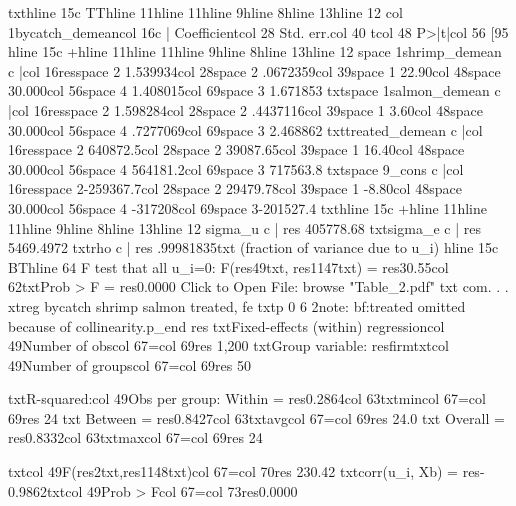 {txt}{hline 15}{c TT}{hline 11}{hline 11}{hline 9}{hline 8}{hline 13}{hline 12}
{col 1}bycatch_demean{col 16}{c |} Coefficient{col 28}  Std. err.{col 40}      t{col 48}   P>|t|{col 56}     [95%
{hline 15}{c +}{hline 11}{hline 11}{hline 9}{hline 8}{hline 13}{hline 12}
{space 1}shrimp_demean {c |}{col 16}{res}{space 2} 1.539934{col 28}{space 2} .0672359{col 39}{space 1}   22.90{col 48}{space 3}0.000{col 56}{space 4} 1.408015{col 69}{space 3} 1.671853
{txt}{space 1}salmon_demean {c |}{col 16}{res}{space 2} 1.598284{col 28}{space 2} .4437116{col 39}{space 1}    3.60{col 48}{space 3}0.000{col 56}{space 4} .7277069{col 69}{space 3} 2.468862
{txt}treated_demean {c |}{col 16}{res}{space 2} 640872.5{col 28}{space 2} 39087.65{col 39}{space 1}   16.40{col 48}{space 3}0.000{col 56}{space 4} 564181.2{col 69}{space 3} 717563.8
{txt}{space 9}_cons {c |}{col 16}{res}{space 2}-259367.7{col 28}{space 2} 29479.78{col 39}{space 1}   -8.80{col 48}{space 3}0.000{col 56}{space 4}  -317208{col 69}{space 3}-201527.4
{txt}{hline 15}{c +}{hline 11}{hline 11}{hline 9}{hline 8}{hline 13}{hline 12}
       sigma_u {c |} {res} 405778.68
       {txt}sigma_e {c |} {res} 5469.4972
           {txt}rho {c |} {res} .99981835{txt}   (fraction of variance due to u_i)
{hline 15}{c BT}{hline 64}
F test that all u_i=0: F({res}49{txt}, {res}1147{txt}) = {res}30.55{col 62}{txt}Prob > F = {res}0.0000
Click to Open File:  {browse "Table_2.pdf"}
{txt}
{com}. 
. 
. xtreg bycatch shrimp salmon treated, fe
{txt}{p 0 6 2}note: {bf:treated} omitted because of collinearity.{p_end}
{res}
{txt}Fixed-effects (within) regression{col 49}Number of obs{col 67}={col 69}{res}     1,200
{txt}Group variable: {res}firm{txt}{col 49}Number of groups{col 67}={col 69}{res}        50

{txt}R-squared:{col 49}Obs per group:
     Within  = {res}0.2864{col 63}{txt}min{col 67}={col 69}{res}        24
{txt}     Between = {res}0.8427{col 63}{txt}avg{col 67}={col 69}{res}      24.0
{txt}     Overall = {res}0.8332{col 63}{txt}max{col 67}={col 69}{res}        24

{txt}{col 49}F({res}2{txt},{res}1148{txt}){col 67}={col 70}{res}   230.42
{txt}corr(u_i, Xb) = {res}-0.9862{txt}{col 49}Prob > F{col 67}={col 73}{res}0.0000

